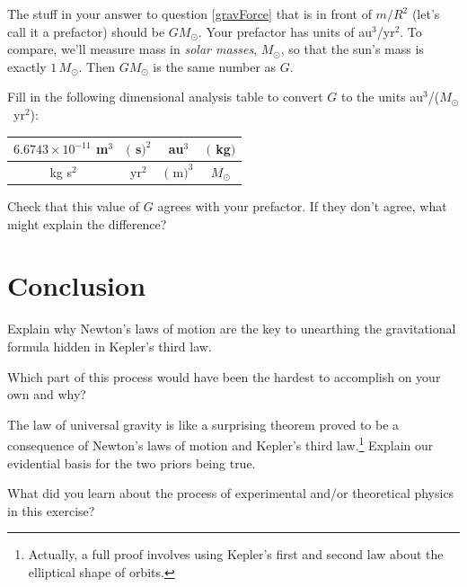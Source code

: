 \documentclass{handout}
\begin{document}
The stuff in your answer to question \ref{gravForce} that is in front of $m/R^2$ (let's call it a prefactor) should be $GM_\odot$. Your prefactor has units of au$^3$/yr$^2$. To compare, we'll measure mass in \emph{solar masses}, $M_\odot$, so that the sun's mass is exactly $1\,M_\odot$. Then $GM_\odot$ is the same number as $G$.

\begin{questions}

    \question Fill in the following dimensional analysis table to convert $G$ to the units \mbox{au$^3$/($M_\odot$ yr$^2$)}:

    \begin{tabular}{c|c|c|c}
         $6.6743\times 10^{-11}$ m$^3$& $\Bigg($\hspace{1.5in} s$\Bigg)^2$ & au$^3$&$\Bigg($\hspace{.7in} kg$\Bigg)$\\\hline
         kg s$^2$& yr$^2$ &  $\Bigg($\hspace{.7in} m$\Bigg)^3$ & $M_\odot$
    \end{tabular}

    \answerspace{1in}

    \question Check that this value of $G$ agrees with your prefactor. If they don't agree, what might explain the difference?

    \answerspace{1.5in}
    \clearpage

\end{questions}

\section{Conclusion}
\begin{questions}
    \question Explain why Newton's laws of motion are the key to unearthing the gravitational formula hidden in Kepler's third law.

    \answerspace{1.5in}

    \question Which part of this process would have been the hardest to accomplish on your own and why?

    \answerspace{1.5in}

    \question The law of universal gravity is like a surprising theorem proved to be a consequence of Newton's laws of motion and Kepler's third law.\footnote{Actually, a full proof involves using Kepler's first and second law about the elliptical shape of orbits.} Explain our evidential basis for the two priors being true.

    \answerspace{1.5in}

    \question What did you learn about the process of experimental and/or theoretical physics in this exercise?

\end{questions}
\end{document}
